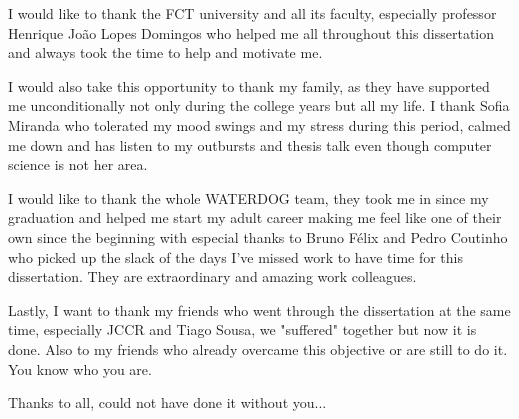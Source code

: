 \acknowledgements

I would like to thank the FCT university and all its faculty, especially professor Henrique João Lopes Domingos who helped me all throughout this dissertation and always took the time to help and motivate me. 

I would also take this opportunity to thank my family, as they have supported me unconditionally not only during the college years but all my life. I thank Sofia Miranda who tolerated my mood swings and my stress during this period, calmed me down and has listen to my outbursts and thesis talk even though computer science is not her area.

I would like to thank the whole WATERDOG team, they took me in since my graduation and helped me start my adult career making me feel like one of their own since the beginning with especial thanks to Bruno Félix and Pedro Coutinho who picked up the slack of the days I've missed work to have time for this dissertation. They are extraordinary and amazing work colleagues.

Lastly, I want to thank my friends who went through the dissertation at the same time, especially JCCR and Tiago Sousa, we "suffered" together but now it is done. Also to my friends who already overcame this objective or are still to do it. You know who you are.

\vspace{20mm}

Thanks to all, could not have done it without you...